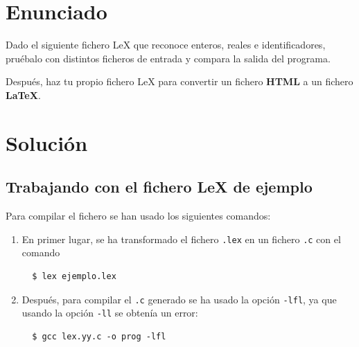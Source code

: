 \documentclass[10pt,a4paper,spanish]{report}
\begin{document}
\section{\textcolor{p5}Enunciado}
Dado el siguiente fichero LeX que reconoce enteros, reales e identificadores, pruébalo con distintos ficheros de entrada y compara la salida del programa.


Después, haz tu propio fichero LeX para convertir un fichero \textcolor{p5}{\textbf{HTML}} a un fichero \textcolor{p5}{\textbf{LaTeX}}.

\section{\textcolor{p5}Solución}
\subsection{\textcolor{p5}Trabajando con el fichero LeX de ejemplo}
Para compilar el fichero se han usado los siguientes comandos:
\begin{enumerate}[1.]
  \item En primer lugar, se ha transformado el fichero \texttt{.lex} en un fichero \texttt{.c} con el comando
  \begin{verbatim}
  $ lex ejemplo.lex
  \end{verbatim}

  \item Después, para compilar el \texttt{.c} generado se ha usado la opción \texttt{-lfl}, ya que usando la opción \texttt{-ll} se obtenía un error:
  \begin{verbatim}
  $ gcc lex.yy.c -o prog -lfl
  \end{verbatim}
\end{enumerate}
\end{document}
